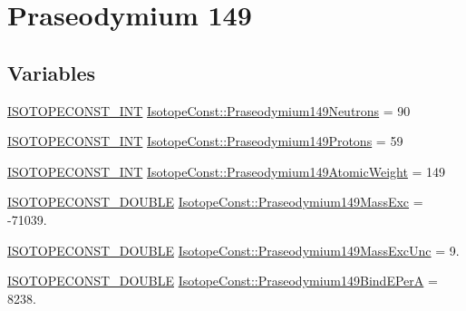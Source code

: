 \hypertarget{group___isotope_const-_praseodymium-_pr149}{}\section{Praseodymium 149}
\label{group___isotope_const-_praseodymium-_pr149}
\subsection*{Variables}
\begin{DoxyCompactItemize}
\item 
\mbox{\hyperlink{group___isotope_const-_macros_ga5f18360b3e99483a35c32d789e62621c}{I\+S\+O\+T\+O\+P\+E\+C\+O\+N\+S\+T\+\_\+\+I\+NT}} \mbox{\hyperlink{group___isotope_const-_praseodymium-_pr149_gae41419ab1009ed5709d46bdd756c02d8}{Isotope\+Const\+::\+Praseodymium149\+Neutrons}} = 90
\item 
\mbox{\hyperlink{group___isotope_const-_macros_ga5f18360b3e99483a35c32d789e62621c}{I\+S\+O\+T\+O\+P\+E\+C\+O\+N\+S\+T\+\_\+\+I\+NT}} \mbox{\hyperlink{group___isotope_const-_praseodymium-_pr149_ga1877cf43bb378122b1e318f9ba36624c}{Isotope\+Const\+::\+Praseodymium149\+Protons}} = 59
\item 
\mbox{\hyperlink{group___isotope_const-_macros_ga5f18360b3e99483a35c32d789e62621c}{I\+S\+O\+T\+O\+P\+E\+C\+O\+N\+S\+T\+\_\+\+I\+NT}} \mbox{\hyperlink{group___isotope_const-_praseodymium-_pr149_gafec4527c39affbada6cac125cc3a4fcc}{Isotope\+Const\+::\+Praseodymium149\+Atomic\+Weight}} = 149
\item 
\mbox{\hyperlink{group___isotope_const-_macros_ga8f45a7272ce02c0b4c65c44636ed719a}{I\+S\+O\+T\+O\+P\+E\+C\+O\+N\+S\+T\+\_\+\+D\+O\+U\+B\+LE}} \mbox{\hyperlink{group___isotope_const-_praseodymium-_pr149_gaccd62db1f21588bc428b72f3f4e8d9fe}{Isotope\+Const\+::\+Praseodymium149\+Mass\+Exc}} = -\/71039.
\item 
\mbox{\hyperlink{group___isotope_const-_macros_ga8f45a7272ce02c0b4c65c44636ed719a}{I\+S\+O\+T\+O\+P\+E\+C\+O\+N\+S\+T\+\_\+\+D\+O\+U\+B\+LE}} \mbox{\hyperlink{group___isotope_const-_praseodymium-_pr149_gaee0b8691151e79c04f585efc9150d9aa}{Isotope\+Const\+::\+Praseodymium149\+Mass\+Exc\+Unc}} = 9.
\item 
\mbox{\hyperlink{group___isotope_const-_macros_ga8f45a7272ce02c0b4c65c44636ed719a}{I\+S\+O\+T\+O\+P\+E\+C\+O\+N\+S\+T\+\_\+\+D\+O\+U\+B\+LE}} \mbox{\hyperlink{group___isotope_const-_praseodymium-_pr149_gaf8ca5655821512ebafd947fb5d64036a}{Isotope\+Const\+::\+Praseodymium149\+Bind\+E\+PerA}} = 8238.

\end{DoxyCompactItemize}
